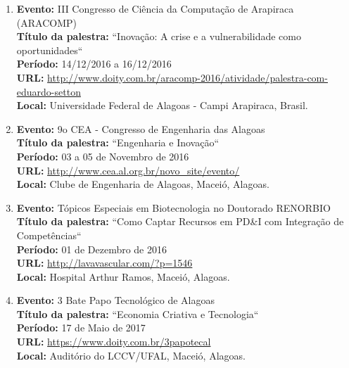 \documentclass[a4paper,oneside,10pt]{article}
\begin{document}
\begin{enumerate}
\newpage
\item   \textbf{Evento:}  III Congresso de Ciência da Computação de Arapiraca (ARACOMP) \mbox{} \\
        \textbf{Título da palestra:} ``Inovação: A crise e a vulnerabilidade como oportunidades``\\
        \textbf{Período:} 14/12/2016 a 16/12/2016\\
        \textbf{URL:} \url{http://www.doity.com.br/aracomp-2016/atividade/palestra-com-eduardo-setton}\\
        \textbf{Local:} Universidade Federal de Alagoas - Campi Arapiraca, Brasil.
        
 \item   \textbf{Evento:} 9o CEA - Congresso de Engenharia das Alagoas
  \mbox{} \\
         \textbf{Título da palestra:}  ``Engenharia e Inovação``\\
        \textbf{Período:} 03 a 05 de Novembro de 2016\\
        \textbf{URL:} \url{http://www.cea.al.org.br/novo_site/evento/}\\
        \textbf{Local:} Clube de Engenharia de Alagoas, Maceió, Alagoas. 
            
 \item   \textbf{Evento:} Tópicos Especiais em Biotecnologia no Doutorado RENORBIO
  \mbox{} \\
         \textbf{Título da palestra:}  ``Como Captar Recursos em PD\&I com Integração de Competências``\\
        \textbf{Período:} 01 de Dezembro de 2016\\
        \textbf{URL:} \url{http://lavavascular.com/?p=1546}\\
        \textbf{Local:} Hospital Arthur Ramos, Maceió, Alagoas.     
          
  \item   \textbf{Evento:} 3 Bate Papo Tecnológico de Alagoas
  \mbox{} \\
         \textbf{Título da palestra:}  ``Economia Criativa e Tecnologia``\\
        \textbf{Período:} 17 de Maio de 2017\\
        \textbf{URL:} \url{https://www.doity.com.br/3papotecal}\\
        \textbf{Local:} Auditório do LCCV/UFAL, Maceió, Alagoas.  
        

\end{enumerate}
\end{document}
